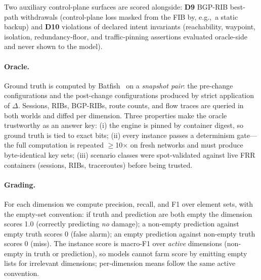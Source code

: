 \documentclass[11pt]{article}
\newcommand{\eg}{e.g.,\ }
\begin{document}
Two auxiliary control-plane surfaces are scored alongside: \textbf{D9}
BGP-RIB best-path withdrawals (control-plane loss masked from the FIB by,
\eg a static backup) and \textbf{D10} violations of declared intent
invariants (reachability, waypoint, isolation, redundancy-floor, and
traffic-pinning assertions evaluated oracle-side and never shown to the
model).

\paragraph{Oracle.} Ground truth is computed by Batfish~\cite{batfish} on a
\emph{snapshot pair}: the pre-change configurations and the post-change
configurations produced by strict application of $\Delta$. Sessions, RIBs,
BGP-RIBs, route counts, and flow traces are queried in both worlds and
diffed per dimension. Three properties make the oracle trustworthy as an
answer key: (i) the engine is pinned by container digest, so ground truth is
tied to exact bits; (ii) every instance passes a determinism gate---the full
computation is repeated $\geq$10$\times$ on fresh networks and must produce
byte-identical key sets; (iii) scenario classes were spot-validated against
live FRR containers (sessions, RIBs, traceroutes) before being trusted.

\paragraph{Grading.}
\label{sec:grading}
For each dimension we compute precision, recall, and F1
over element sets, with the empty-set convention: if truth and prediction are
both empty the dimension scores 1.0 (correctly predicting \emph{no} damage);
a non-empty prediction against empty truth scores 0 (false alarm); an empty
prediction against non-empty truth scores 0 (miss). The instance score is
macro-F1 over \emph{active} dimensions (non-empty in truth or prediction),
so models cannot farm score by emitting empty lists for irrelevant
dimensions; per-dimension means follow the same active convention.
\end{document}
